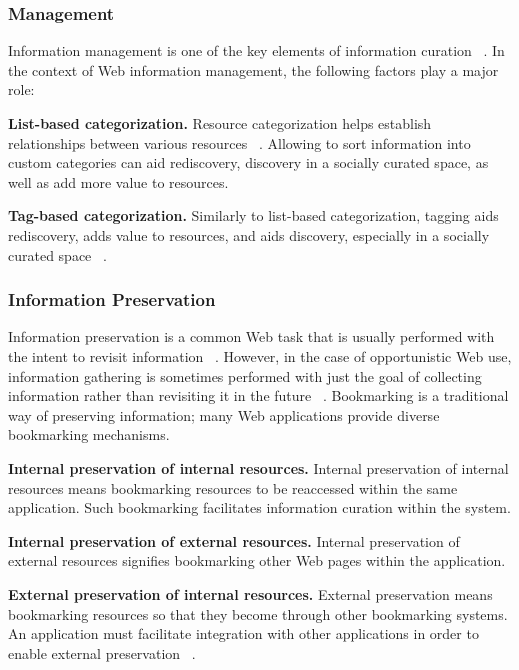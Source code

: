 \documentclass{casconpaper}
\begin{document}
{\subsubsection{Management}
Information management is one of the key elements of information curation ~\cite{beagrie, wittaker}. In the context of Web information management, the following factors play a major role:

\textbf{List-based categorization.} Resource categorization helps establish relationships between various resources ~\cite{beagrie, wittaker}. Allowing to sort information into custom categories can aid rediscovery, discovery in a socially curated space, as well as add more value to resources.

\textbf{Tag-based categorization.} Similarly to list-based categorization, tagging aids rediscovery, adds value to resources, and aids discovery, especially in a socially curated space ~\cite{gruber}.

} %

{\subsubsection{Information Preservation}
Information preservation is a common Web task that is usually performed with the intent to revisit information ~\cite{abrams, wittaker}. However, in the case of opportunistic Web use, information gathering is sometimes performed with just the goal of collecting information rather than revisiting it in the future ~\cite{lindley}. Bookmarking is a traditional way of preserving information; many Web applications provide diverse bookmarking mechanisms. 

\textbf{Internal preservation of internal resources.} Internal preservation of internal resources means bookmarking resources to be reaccessed within the same application. Such bookmarking facilitates information curation within the system.

\textbf{Internal preservation of external resources.} Internal preservation of external resources signifies bookmarking other Web pages within the application. 
  
\textbf{External preservation of internal resources.} External preservation means bookmarking resources so that they become through other bookmarking systems. An application must facilitate integration with other applications in order to enable external preservation ~\cite{abrams}.

} %
\end{document}
